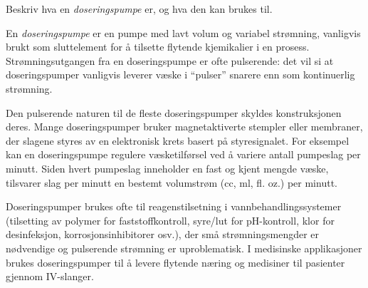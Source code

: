 

Beskriv hva en {\it doseringspumpe} er, og hva den kan brukes til.













En {\it doseringspumpe} er en pumpe med lavt volum og variabel strømning, vanligvis brukt som sluttelement for å tilsette flytende kjemikalier i en prosess. Strømningsutgangen fra en doseringspumpe er ofte pulserende: det vil si at doseringspumper vanligvis leverer væske i ``pulser'' snarere enn som kontinuerlig strømning.
 
\vskip 10pt

Den pulserende naturen til de fleste doseringspumper skyldes konstruksjonen deres. Mange doseringspumper bruker magnetaktiverte stempler eller membraner, der slagene styres av en elektronisk krets basert på styresignalet. For eksempel kan en doseringspumpe regulere væsketilførsel ved å variere antall pumpeslag per minutt. Siden hvert pumpeslag inneholder en fast og kjent mengde væske, tilsvarer slag per minutt en bestemt volumstrøm (cc, ml, fl. oz.) per minutt.
 
Doseringspumper brukes ofte til reagenstilsetning i vannbehandlingssystemer (tilsetting av polymer for faststoffkontroll, syre/lut for pH-kontroll, klor for desinfeksjon, korrosjonsinhibitorer osv.), der små strømningsmengder er nødvendige og pulserende strømning er uproblematisk. I medisinske applikasjoner brukes doseringspumper til å levere flytende næring og medisiner til pasienter gjennom IV-slanger.



